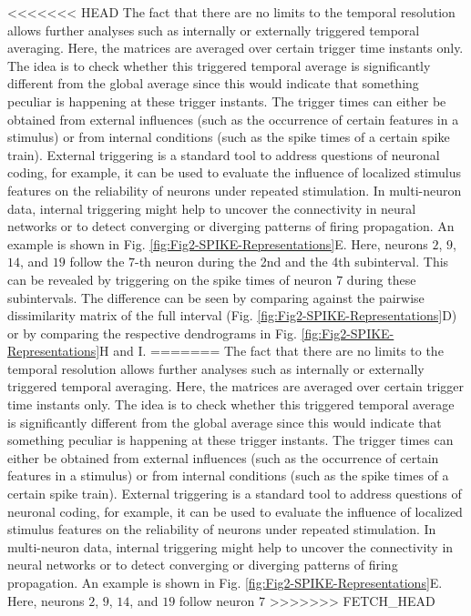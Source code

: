 \documentclass[10pt,twocolumn]{elsart5p}
\begin{document}
<<<<<<< HEAD
The fact that there are no limits to the temporal resolution allows further analyses such as internally or externally triggered temporal averaging. Here, the matrices are averaged over certain trigger time instants only. The idea is to check whether this triggered temporal average is significantly different from the global average since this would indicate that something peculiar is happening at these trigger instants. The trigger times can either be obtained from external influences (such as the occurrence of certain features in a stimulus) or from internal conditions (such as the spike times of a certain spike train). External triggering is a standard tool to address questions of neuronal coding, for example, it can be used to evaluate the influence of localized stimulus features on the reliability of neurons under repeated stimulation. In multi-neuron data, internal triggering might help to uncover the connectivity in neural networks or to detect converging or diverging patterns of firing propagation. An example is shown in Fig. \ref{fig:Fig2-SPIKE-Representations}E. Here, neurons $2$, $9$, $14$, and $19$ follow the $7$-th neuron during the 2nd and the 4th subinterval. This can be revealed by triggering on the spike times of neuron $7$ during these subintervals. The difference can be seen by comparing against the pairwise dissimilarity matrix of the full interval (Fig. \ref{fig:Fig2-SPIKE-Representations}D) or by comparing the respective dendrograms in Fig. \ref{fig:Fig2-SPIKE-Representations}H and I.
=======
The fact that there are no limits to the temporal resolution allows further analyses such as internally or externally triggered temporal averaging. Here, the matrices are averaged over certain trigger time instants only. The idea is to check whether this triggered temporal average is significantly different from the global average since this would indicate that something peculiar is happening at these trigger instants. The trigger times can either be obtained from external influences (such as the occurrence of certain features in a stimulus) or from internal conditions (such as the spike times of a certain spike train). External triggering is a standard tool to address questions of neuronal coding, for example, it can be used to evaluate the influence of localized stimulus features on the reliability of neurons under repeated stimulation. In multi-neuron data, internal triggering might help to uncover the connectivity in neural networks or to detect converging or diverging patterns of firing propagation. An example is shown in Fig. \ref{fig:Fig2-SPIKE-Representations}E. Here, neurons $2$, $9$, $14$, and $19$ follow neuron $7$ 
>>>>>>> FETCH_HEAD
\end{document}
